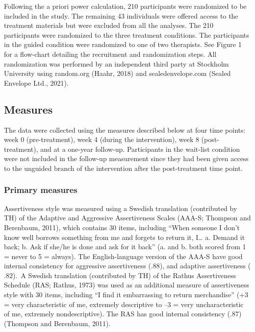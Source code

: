 \documentclass[3p]{elsarticle} %
\begin{document}
Following the a priori power calculation, 210 participants were
randomized to be included in the study. The remaining 43 individuals
were offered access to the treatment materials but were excluded from
all the analyses. The 210 participants were randomized to the three
treatment conditions. The participants in the guided condition were
randomized to one of two therapists. See Figure 1 for a flow-chart
detailing the recruitment and randomization steps. All randomization was
performed by an independent third party at Stockholm University using
random.org (Haahr, 2018) and sealedenvelope.com (Sealed Envelope Ltd.,
2021).

\hypertarget{measures}{%
\subsection{Measures}\label{measures}}

The data were collected using the measures described below at four time
points: week 0 (pre-treatment), week 4 (during the intervention), week 8
(post-treatment), and at a one-year follow-up. Participants in the
wait-list condition were not included in the follow-up measurement since
they had been given access to the unguided branch of the intervention
after the post-treatment time point.

\hypertarget{primary-measures}{%
\subsubsection{Primary measures}\label{primary-measures}}

Assertiveness style was measured using a Swedish translation
(contributed by TH) of the Adaptive and Aggressive Assertiveness Scales
(AAA-S; Thompson and Berenbaum, 2011), which contains 30 items,
including ``When someone I don't know well borrows something from me and
forgets to return it, I\ldots{} a. Demand it back; b. Ask if she/he is
done and ask for it back'' (a. and b. both scored from 1 = never to 5 =
always). \color{newtext}The English-language version of the AAA-S have
good internal consistency for aggressive assertiveness (\(.88\)), and
adaptive assertiveness (\(.82\)).\color{oldtext}~A Swedish translation
(contributed by TH) of the Rathus Assertiveness Schedule (RAS; Rathus,
1973) was used as an additional measure of assertiveness style with 30
items, including ``I find it embarrassing to return merchandise'' (+3 =
very characteristic of me, extremely descriptive to --3 = very
uncharacteristic of me, extremely nondescriptive). The RAS has good
internal consistency (\(.87\)) (Thompson and Berenbaum, 2011).
\end{document}
